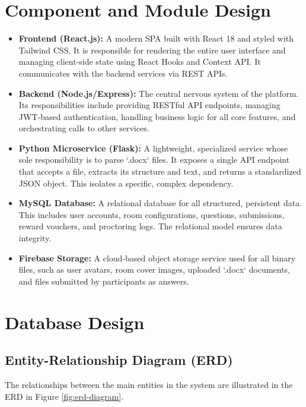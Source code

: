 \section{Component and Module Design}
\label{sec:arch-components}
\begin{itemize}
    \item \textbf{Frontend (React.js):} A modern SPA built with React 18 and styled with Tailwind CSS. It is responsible for rendering the entire user interface and managing client-side state using React Hooks and Context API. It communicates with the backend services via REST APIs.

    \item \textbf{Backend (Node.js/Express):} The central nervous system of the platform. Its responsibilities include providing RESTful API endpoints, managing JWT-based authentication, handling business logic for all core features, and orchestrating calls to other services.

    \item \textbf{Python Microservice (Flask):} A lightweight, specialized service whose sole responsibility is to parse `.docx` files. It exposes a single API endpoint that accepts a file, extracts its structure and text, and returns a standardized JSON object. This isolates a specific, complex dependency.

    \item \textbf{MySQL Database:} A relational database for all structured, persistent data. This includes user accounts, room configurations, questions, submissions, reward vouchers, and proctoring logs. The relational model ensures data integrity.

    \item \textbf{Firebase Storage:} A cloud-based object storage service used for all binary files, such as user avatars, room cover images, uploaded `.docx` documents, and files submitted by participants as answers.
\end{itemize}

\section{Database Design}
\label{sec:arch-database}

\subsection{Entity-Relationship Diagram (ERD)}
The relationships between the main entities in the system are illustrated in the ERD in Figure \ref{fig:erd-diagram}.

